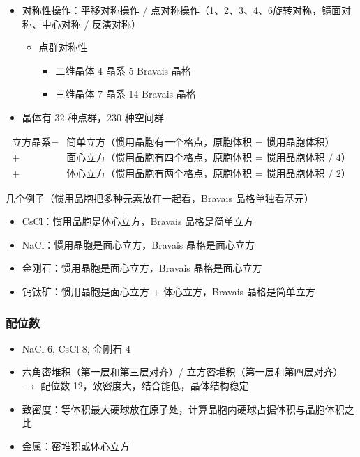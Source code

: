 \begin{itemize}
    \item 对称性操作：平移对称操作 / 点对称操作（1、2、3、4、6旋转对称，镜面对称、中心对称 / 反演对称）\begin{itemize}
              \item 点群对称性\begin{itemize}
                        \item 二维晶体 4 晶系 5 Bravais 晶格
                        \item 三维晶体 7 晶系 14 Bravais 晶格
                    \end{itemize}
          \end{itemize}
    \item 晶体有 32 种点群，230 种空间群
\end{itemize}
\begin{align*}
    \text{立方晶系} = & \text{简单立方（惯用晶胞有一个格点，原胞体积 = 惯用晶胞体积）}     \\
    +             & \text{面心立方（惯用晶胞有四个格点，原胞体积 = 惯用晶胞体积 / 4）} \\
    +             & \text{体心立方（惯用晶胞有两个格点，原胞体积 = 惯用晶胞体积 / 2）}
\end{align*}


几个例子（惯用晶胞把多种元素放在一起看，Bravais 晶格单独看基元）
\begin{itemize}
    \item CsCl：惯用晶胞是体心立方，Bravais 晶格是简单立方
    \item NaCl：惯用晶胞是面心立方，Bravais 晶格是面心立方
    \item 金刚石：惯用晶胞是面心立方，Bravais 晶格是面心立方
    \item 钙钛矿：惯用晶胞是面心立方 + 体心立方，Bravais 晶格是简单立方
\end{itemize}

\subsubsection{配位数}

\begin{itemize}
    \item NaCl 6, CsCl 8, 金刚石 4
    \item 六角密堆积（第一层和第三层对齐）/ 立方密堆积（第一层和第四层对齐） $\to$ 配位数 12，致密度大，结合能低，晶体结构稳定
    \item 致密度：等体积最大硬球放在原子处，计算晶胞内硬球占据体积与晶胞体积之比
    \item 金属：密堆积或体心立方
\end{itemize}

